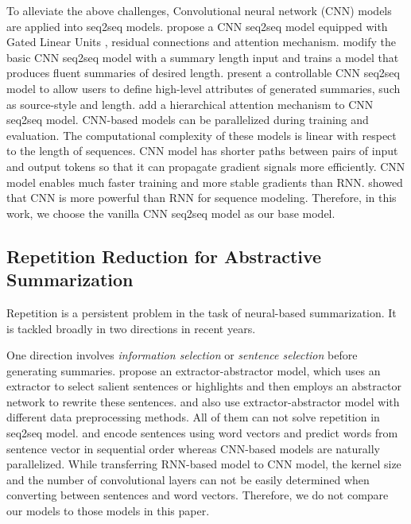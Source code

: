To alleviate the above challenges,
Convolutional neural network (CNN) 
models~\citep{gehring2017convs2s,FanGA18,LiuLZ18,Zhang2019AbstractTS} 
are applied into seq2seq models.
\cite{gehring2017convs2s} propose a CNN seq2seq model equipped with
Gated Linear Units \citep{DauphinFAG17}, residual connections \citep{HeZRS16}
and attention mechanism. 
\cite{LiuLZ18} modify the basic CNN seq2seq model with a summary length
input and trains a model that produces fluent summaries of desired length.
\cite{FanGA18} present a controllable CNN seq2seq model to
allow users to define high-level attributes of generated
summaries, such as source-style and length.
\cite{Zhang2019AbstractTS} add a hierarchical attention mechanism to CNN seq2seq model.
CNN-based models can be parallelized during
training and evaluation. The computational complexity of
these models is linear with respect to the length of sequences.
CNN model has shorter paths between pairs of input and
output tokens so that it can propagate gradient signals more
efficiently.
CNN model enables much faster training and more stable gradients 
than RNN. 
\cite{bai2018empirical} showed that CNN is more powerful than 
RNN for sequence modeling.
Therefore, in this work, we choose the vanilla CNN seq2seq model as 
our base model.

\subsection{Repetition Reduction for Abstractive Summarization}
Repetition is a persistent problem in the task of 
neural-based summarization. 
It is tackled broadly in two directions in recent years. 

One direction involves {\em information selection} or 
{\em sentence selection} before generating summaries.
\cite{P18-1063} propose an extractor-abstractor model, which uses an extractor  
to select salient sentences or highlights and then employs 
an abstractor network to rewrite these sentences.
\cite{SharmaHHW19} and \cite{SanghwanB19} also use extractor-abstractor model 
with different data preprocessing methods.
All of them can not solve repetition in seq2seq model.
\cite{TanWX17} and \cite{D18-1205,D18-1441} encode
sentences using word vectors
and predict words from sentence vector in sequential order 
whereas CNN-based models are naturally parallelized. 
While transferring RNN-based model to CNN model, 
the kernel size and the number of 
convolutional layers can not be easily determined when
converting between sentences and word vectors. 
Therefore, we do not compare our models to those models in this paper. 

